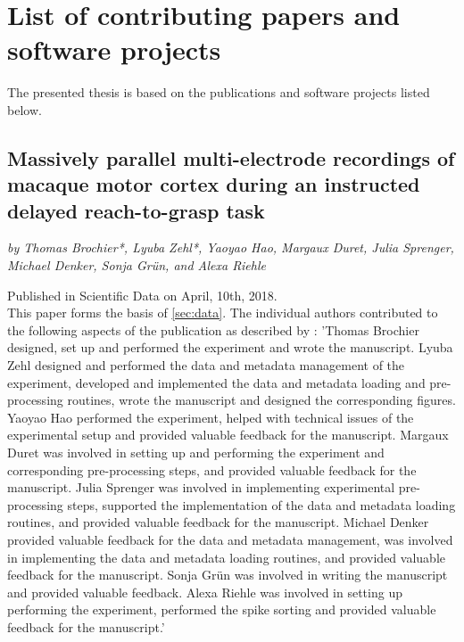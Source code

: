 \hypersetup{pageanchor=false} %

\clearpage
\pagestyle{plain}
\section*{List of contributing papers and software projects}
\label{sec:ListofPapers}


The presented thesis is based on the publications and software projects listed below.


\subsection*{Massively parallel multi-electrode recordings of macaque motor cortex during an instructed delayed reach-to-grasp task}
\textit{by Thomas Brochier*, Lyuba Zehl*, Yaoyao Hao, Margaux Duret, Julia Sprenger, Michael Denker, Sonja Grün, and Alexa Riehle}

Published in Scientific Data on April, 10th, 2018. \citep{Brochier_2018}\\

This paper forms the basis of \cref{sec:data}. The individual authors contributed to the following aspects of the publication as described by \citet{Zehl_2018}: 'Thomas Brochier designed, set up and performed the experiment and wrote the manuscript. Lyuba Zehl designed and performed the data and metadata management of the experiment, developed and implemented the data and metadata loading and pre-processing routines, wrote the manuscript and designed the corresponding figures. Yaoyao Hao performed the experiment, helped with technical issues of the experimental setup and provided valuable feedback for the manuscript. Margaux Duret was involved in setting up and performing the experiment and corresponding pre-processing steps, and provided valuable feedback for the manuscript. Julia Sprenger was involved in implementing experimental pre-processing steps, supported the implementation of the data and metadata loading routines, and provided valuable feedback for the manuscript. Michael Denker provided valuable feedback for the data and metadata management, was involved in implementing the data and metadata loading routines, and provided valuable feedback for the manuscript. Sonja Grün was involved in writing the manuscript and provided valuable feedback. Alexa Riehle was involved in setting up performing the experiment, performed the spike sorting and provided valuable feedback for the manuscript.'


